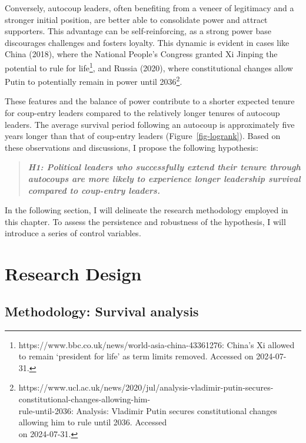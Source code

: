 \documentclass[
  12pt,
]{report}
\begin{document}
Conversely, autocoup leaders, often benefiting from a veneer of
legitimacy and a stronger initial position, are better able to
consolidate power and attract supporters. This advantage can be
self-reinforcing, as a strong power base discourages challenges and
fosters loyalty. This dynamic is evident in cases like China (2018),
where the National People's Congress granted Xi Jinping the potential to
rule for life\footnote{https://www.bbc.co.uk/news/world-asia-china-43361276:
  China's Xi allowed to remain `president for life' as term limits
  removed. Accessed on 2024-07-31.}, and Russia (2020), where
constitutional changes allow Putin to potentially remain in power until
2036\footnote{https://www.ucl.ac.uk/news/2020/jul/analysis-vladimir-putin-secures-constitutional-changes-allowing-him-\\
  rule-until-2036: Analysis: Vladimir Putin secures constitutional
  changes allowing him to rule until 2036. Accessed\\
  on 2024-07-31.}.

These features and the balance of power contribute to a shorter expected
tenure for coup-entry leaders compared to the relatively longer tenures
of autocoup leaders. The average survival period following an autocoup
is approximately five years longer than that of coup-entry leaders
(Figure~\ref{fig-logrank}). Based on these observations and discussions,
I propose the following hypothesis:

\begin{quote}
\textbf{\emph{H1: Political leaders who successfully extend their tenure
through autocoups are more likely to experience longer leadership
survival compared to coup-entry leaders.}}
\end{quote}

In the following section, I will delineate the research methodology
employed in this chapter. To assess the persistence and robustness of
the hypothesis, I will introduce a series of control variables.

\section{Research Design}\label{research-design-1}

\subsection{Methodology: Survival
analysis}\label{methodology-survival-analysis}
\end{document}
